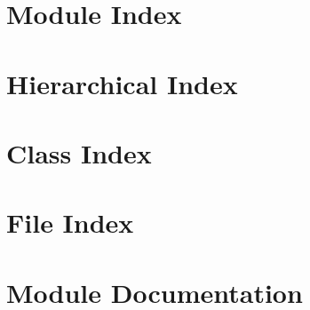 \let\mypdfximage\pdfximage\def\pdfximage{\immediate\mypdfximage}\documentclass[twoside]{book}
\newcommand{\+}{\discretionary{\mbox{\scriptsize$\hookleftarrow$}}{}{}}
\begin{document}
\chapter{Module Index}

\chapter{Hierarchical Index}

\chapter{Class Index}

\chapter{File Index}

\chapter{Module Documentation}
















\end{document}
